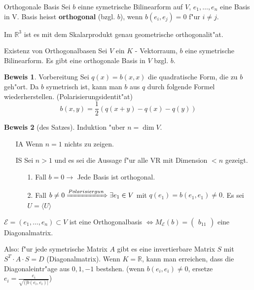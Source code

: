 \documentclass[oneside,fontsize=11pt,paper=a4,BCOR=0mm,DIV=12,automark,headsepline]{scrbook}
\theoremstyle{remark}
\theoremstyle{definition}
\theoremstyle{definition}
\newtheorem*{prof}{Beweis}
\theoremstyle{remark}
\begin{document}
\begin{definition}{Orthogonale Basis}
  Sei $b$ einne symetrische Bilinearform auf $V$, $e_1,\ldots, e_n$ eine Basis
  in V. Basis heisst \textbf{orthogonal} (bzgl. $b$), wenn $b(e_i,e_j)=0$ f"ur
  $i\not= j$.
\end{definition}

\begin{exa}
  Im $\mathbb{R}^3$ ist es mit dem Skalarprodukt genau geometrische orthogonalit"at.
\end{exa}

\begin{satz}{Existenz von Orthogonalbasen}
  Sei $V$ ein $K$ - Vektorraum, $b$ eine symetrische Bilinearform. Es gibt eine
  orthogonale Basis in $V$ bzgl. $b$.
\end{satz}

\begin{prof} {Vorbereitung}
  Sei $q(x)=b(x,x)$ die quadratische Form, die zu $b$ geh"ort. Da $b$ symetrisch
  ist, kann man $b$ aus $q$ durch folgende Formel wiederherstellen.
  (Polarisierungsidentit"at)
  \[
    b(x,y) = \frac{1}{2} (q(x+y) - q(x) - q(y))
  \]
\end{prof}
\begin{prof}[des Satzes]
  Induktion "uber $n=\dim V$.\\
  \begin{itemize}
  \item[IA] Wenn $n=1$ nichts zu zeigen.
  \item[IS] Sei $n>1$ und es sei die Aussage f"ur alle VR mit Dimension $<n$
    gezeigt.
    \begin{itemize}
    \item[1. Fall] $b=0\rightarrow$ Jede Basis ist orthogonal.
    \item[2. Fall] $b\not= 0\xRightarrow[]{Polarisiergun} \exists e_1\in V$ mit
      $q(e_1)=b(e_1,e_1)\not= 0$. Es sei $U=\langle {U} \rangle$
    \end{itemize}
  \end{itemize}
\end{prof}

\begin{relation}
  $\mathcal{E}=(e_1,\ldots, e_n) \subset V$ ist eine Orthogonalbasis $\iff
  M_\mathcal{E}(b)=
  \begin{pmatrix}
    b_{11}
  \end{pmatrix}
  $ eine Diagonalmatrix.

  Also: f"ur jede symetrische Matrix $A$ gibt es eine invertierbare Matrix $S$
  mit $S^T\cdot A\cdot S = D$ (Diagonalmatrix). Wenn $K=\mathbb{R}$, kann man
  erreichen, dass die Diagonaleintr"age aus ${0,1,-1}$ bestshen. (wenn
  $b(e_i,e_i)\not= 0$, ersetze $e_i=\frac{e_i}{\sqrt{(|b(e_i, e_i)|}}$)
\end{relation}
\end{document}
